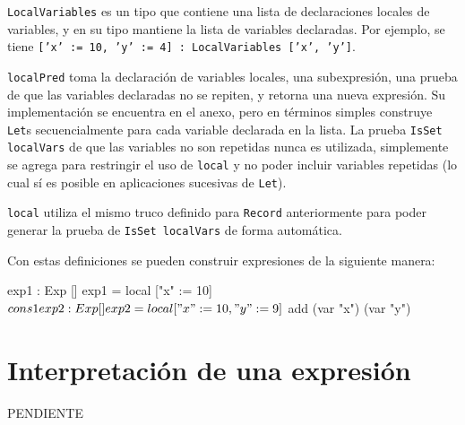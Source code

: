 \texttt{LocalVariables} es un tipo que contiene una lista de declaraciones locales de variables, y en su tipo mantiene la lista de variables declaradas. Por ejemplo, se tiene \texttt{['x' := 10, 'y' := 4] : LocalVariables ['x', 'y']}.

\texttt{localPred} toma la declaración de variables locales, una subexpresión, una prueba de que las variables declaradas no se repiten, y retorna una nueva expresión. Su implementación se encuentra en el anexo, pero en términos simples construye \texttt{Let}s secuencialmente para cada variable declarada en la lista. La prueba \texttt{IsSet localVars} de que las variables no son repetidas nunca es utilizada, simplemente se agrega para restringir el uso de \texttt{local} y no poder incluir variables repetidas (lo cual sí es posible en aplicaciones sucesivas de \texttt{Let}).

\texttt{local} utiliza el mismo truco definido para \texttt{Record} anteriormente para poder generar la prueba de \texttt{IsSet localVars} de forma automática.

Con estas definiciones se pueden construir expresiones de la siguiente manera:

\begin{code}
exp1 : Exp []
exp1 = local ["x" := 10] $ cons 1

exp2 : Exp []
exp2 = local ["x" := 10, "y" := 9] $ add (var "x") (var "y")
\end{code}


\section{Interpretación de una expresión}

PENDIENTE
